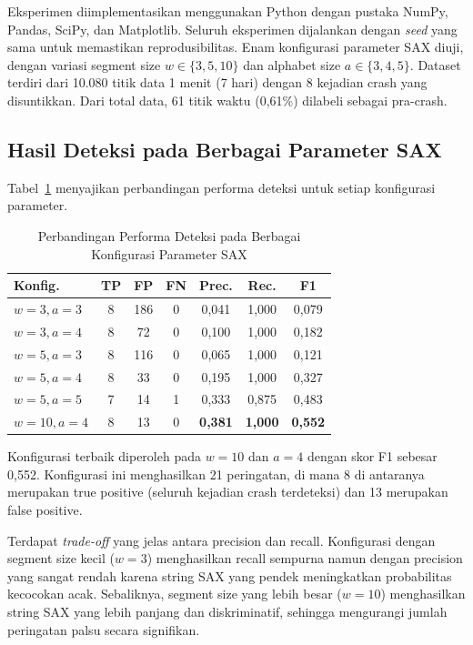 \documentclass[conference]{IEEEtran}
\begin{document}
Eksperimen diimplementasikan menggunakan Python dengan pustaka NumPy, Pandas, SciPy, dan Matplotlib. Seluruh eksperimen dijalankan dengan \textit{seed} yang sama untuk memastikan reprodusibilitas. Enam konfigurasi parameter SAX diuji, dengan variasi segment size $w \in \{3, 5, 10\}$ dan alphabet size $a \in \{3, 4, 5\}$. Dataset terdiri dari 10.080 titik data 1 menit (7 hari) dengan 8 kejadian crash yang disuntikkan. Dari total data, 61 titik waktu (0,61\%) dilabeli sebagai pra-crash.

\subsection{Hasil Deteksi pada Berbagai Parameter SAX}

Tabel~\ref{tab:param_comparison} menyajikan perbandingan performa deteksi untuk setiap konfigurasi parameter.

\begin{table}[t]
\caption{Perbandingan Performa Deteksi pada Berbagai Konfigurasi Parameter SAX}
\label{tab:param_comparison}
\centering
\begin{tabular}{lcccccc}
\toprule
\textbf{Konfig.} & \textbf{TP} & \textbf{FP} & \textbf{FN} & \textbf{Prec.} & \textbf{Rec.} & \textbf{F1} \\
\midrule
$w{=}3, a{=}3$ & 8 & 186 & 0 & 0,041 & 1,000 & 0,079 \\
$w{=}3, a{=}4$ & 8 & 72 & 0 & 0,100 & 1,000 & 0,182 \\
$w{=}5, a{=}3$ & 8 & 116 & 0 & 0,065 & 1,000 & 0,121 \\
$w{=}5, a{=}4$ & 8 & 33 & 0 & 0,195 & 1,000 & 0,327 \\
$w{=}5, a{=}5$ & 7 & 14 & 1 & 0,333 & 0,875 & 0,483 \\
$w{=}10, a{=}4$ & 8 & 13 & 0 & \textbf{0,381} & \textbf{1,000} & \textbf{0,552} \\
\bottomrule
\end{tabular}
\end{table}

Konfigurasi terbaik diperoleh pada $w{=}10$ dan $a{=}4$ dengan skor F1 sebesar 0,552. Konfigurasi ini menghasilkan 21 peringatan, di mana 8 di antaranya merupakan true positive (seluruh kejadian crash terdeteksi) dan 13 merupakan false positive.

Terdapat \textit{trade-off} yang jelas antara precision dan recall. Konfigurasi dengan segment size kecil ($w{=}3$) menghasilkan recall sempurna namun dengan precision yang sangat rendah karena string SAX yang pendek meningkatkan probabilitas kecocokan acak. Sebaliknya, segment size yang lebih besar ($w{=}10$) menghasilkan string SAX yang lebih panjang dan diskriminatif, sehingga mengurangi jumlah peringatan palsu secara signifikan.
\end{document}
